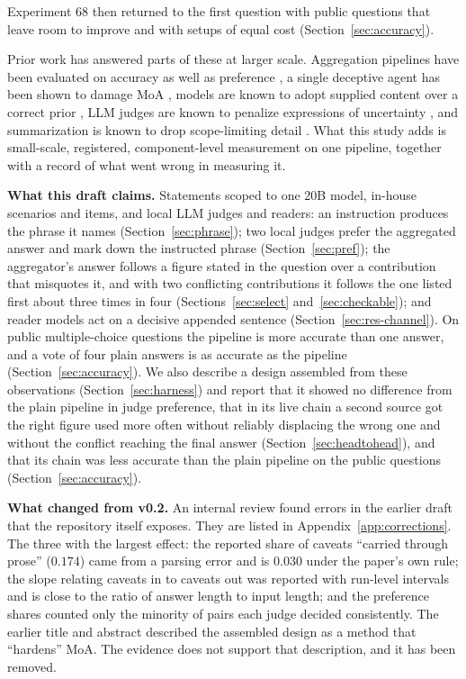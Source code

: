 \documentclass[10pt,twocolumn]{article}
\begin{document}
\noindent Experiment 68 then returned to the first question with public
questions that leave room to improve and with setups of equal cost
(Section~\ref{sec:accuracy}).

Prior work has answered parts of these at larger scale. Aggregation
pipelines have been evaluated on accuracy as well as preference
\cite{wang2024moa,li2025selfmoa}, a single deceptive agent has been
shown to damage MoA \cite{wolf2025doge}, models are known to adopt
supplied content over a correct prior \cite{wu2024clasheval,
xie2024chameleon}, LLM judges are known to penalize expressions of
uncertainty \cite{lee2025judges}, and summarization is known to drop
scope-limiting detail \cite{peters2025generalization,belem2026may}.
What this study adds is small-scale, registered, component-level
measurement on one pipeline, together with a record of what went wrong
in measuring it.

\textbf{What this draft claims.} Statements scoped to one 20B model,
in-house scenarios and items, and local LLM judges and readers: an
instruction produces the phrase it names (Section~\ref{sec:phrase}); two
local judges prefer the aggregated answer and mark down the instructed
phrase (Section~\ref{sec:pref}); the aggregator's answer follows a
figure stated in the question over a contribution that misquotes it,
and with two conflicting contributions it follows the one listed first
about three times in four (Sections~\ref{sec:select}
and~\ref{sec:checkable}); and reader models act on a decisive appended
sentence (Section~\ref{sec:res-channel}). On public multiple-choice
questions the pipeline is more accurate than one answer, and a vote of
four plain answers is as accurate as the pipeline
(Section~\ref{sec:accuracy}). We also describe a design assembled from
these observations (Section~\ref{sec:harness}) and report that it
showed no difference from the plain pipeline in judge preference, that
in its live chain a second source got the right figure used more often
without reliably displacing the wrong one and without the conflict
reaching the final answer (Section~\ref{sec:headtohead}), and that its
chain was less accurate than the plain pipeline on the public questions
(Section~\ref{sec:accuracy}).

\textbf{What changed from v0.2.} An internal review found errors in the
earlier draft that the repository itself exposes. They are listed in
Appendix~\ref{app:corrections}. The three with the largest effect: the
reported share of caveats ``carried through prose'' ($0.174$) came from
a parsing error and is $0.030$ under the paper's own rule; the slope
relating caveats in to caveats out was reported with run-level
intervals and is close to the ratio of answer length to input length;
and the preference shares counted only the minority of pairs each judge
decided consistently. The earlier title and abstract described the
assembled design as a method that ``hardens'' MoA. The evidence does
not support that description, and it has been removed.
\end{document}
